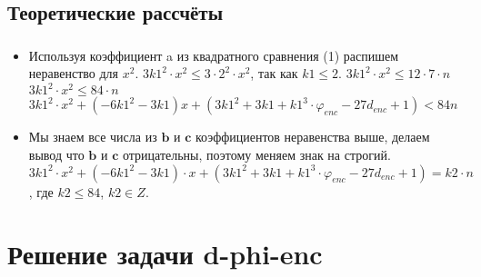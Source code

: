 \documentclass[t]{beamer}
\begin{document}
\subsection{Теоретические рассчёты}
\begin{frame}[t] %
	\frametitle{\insertsection}
	\framesubtitle{\insertsubsection}
        \begin{itemize}
            \item Используя коэффициент a из квадратного сравнения (1) распишем неравенство для $x^2$.\newline
            $3k1^2 \cdot x^2 \leq 3 \cdot 2^2 \cdot x^2$, так как $k1 \leq 2$.\newline
            $3k1^2 \cdot x^2 \leq 12 \cdot 7 \cdot n$\newline
            $3k1^2 \cdot x^2 \leq 84 \cdot n$\newline
            $3k1^2 \cdot x^2+(-6k1^2-3k1)x+(3k1^2+3k1+k1^3 \cdot \varphi_{enc}-27d_{enc}+1) < 84n$\newline
            \item Мы знаем все числа из $\boldsymbol{b}$ и $\boldsymbol{c}$ коэффициентов неравенства выше, делаем вывод что $\boldsymbol{b}$ и $\boldsymbol{c}$ отрицательны, поэтому меняем знак на строгий.\newline
            $3k1^2 \cdot x^2+(-6k1^2-3k1) \cdot x+(3k1^2+3k1+k1^3 \cdot \varphi_{enc}-27d_{enc}+1)=k2 \cdot n$,
            где $k2 \leq 84$, $k2 \in Z$.
	\end{itemize}
\end{frame}

\section{Решение задачи d-phi-enc}
\end{document}
